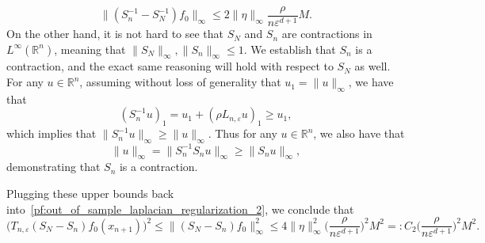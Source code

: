 \documentclass{article}
\newcommand{\Reals}{\mathbb{R}}
\newcommand{\1}{\mathbf{1}}
\theoremstyle{alden}
\theoremstyle{aldenthm}
\theoremstyle{definition}
\theoremstyle{remark}
\begin{document}
\begin{equation*}
\|(S_n^{-1} - S_N^{-1})f_0\|_{\infty} \leq 2 \|\eta\|_{\infty}\frac{\rho}{n\varepsilon^{d + 1}}M.
\end{equation*}
On the other hand, it is not hard to see that $S_N$ and $S_n$ are contractions in $L^{\infty}(\Reals^n)$, meaning that $\|S_N\|_{\infty},\|S_n\|_{\infty} \leq 1$. We establish that $S_n$ is a contraction, and the exact same reasoning will hold with respect to $S_N$ as well. For any $u \in \Reals^n$, assuming without loss of generality that $u_1 = \|u\|_{\infty}$, we have that
\begin{equation*}
(S_n^{-1}u)_1 = u_1 + (\rho L_{n,\varepsilon}u)_1 \geq u_1,
\end{equation*}
which implies that $\|S_n^{-1}u\|_{\infty} \geq \|u\|_{\infty}$. Thus for any $u \in \Reals^n$, we also have that
\begin{equation*}
\|u\|_{\infty} = \|S_n^{-1}S_nu\|_{\infty} \geq \|S_nu\|_{\infty},
\end{equation*}
demonstrating that $S_n$ is a contraction.

Plugging these upper bounds back into~\eqref{pf:out_of_sample_laplacian_regularization_2}, we conclude that
\begin{equation*}
\bigl(T_{n,\varepsilon}(S_N - S_n)f_0(x_{n + 1})\bigr)^2 \leq \|(S_N - S_n)f_0\|_{\infty}^2 \leq 4 \|\eta\|_{\infty}^2\biggl(\frac{\rho}{n\varepsilon^{d + 1}}\biggr)^2M^2 =: C_2 \biggl(\frac{\rho}{n\varepsilon^{d + 1}}\biggr)^2M^2.
\end{equation*}
\end{document}
